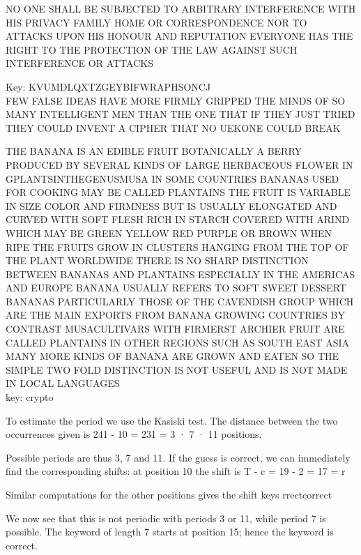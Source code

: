\documentclass[12pt,a4paper]{article}
\begin{document}
\frontpart

 \exercise
	NO ONE SHALL BE SUBJECTED TO ARBITRARY INTERFERENCE WITH HIS PRIVACY FAMILY HOME OR CORRESPONDENCE NOR TO ATTACKS UPON HIS HONOUR AND REPUTATION EVERYONE HAS THE RIGHT TO THE PROTECTION OF THE LAW AGAINST SUCH INTERFERENCE OR ATTACKS

	

 \exercise
 	Key: KVUMDLQXTZGEYBIFWRAPHSONCJ \\
 	\newline
 	FEW FALSE IDEAS HAVE MORE FIRMLY GRIPPED THE MINDS OF SO MANY INTELLIGENT MEN THAN THE ONE THAT IF THEY JUST TRIED THEY COULD INVENT A CIPHER THAT NO UEKONE COULD BREAK

 \exercise
 	THE BANANA IS AN EDIBLE FRUIT BOTANICALLY A BERRY PRODUCED BY SEVERAL KINDS OF LARGE HERBACEOUS FLOWER IN GPLANTSINTHEGENUSMUSA IN SOME COUNTRIES BANANAS 
	USED FOR COOKING MAY BE CALLED PLANTAINS THE FRUIT IS VARIABLE IN SIZE COLOR AND FIRMNESS BUT IS USUALLY ELONGATED AND CURVED WITH SOFT FLESH RICH IN STARCH
	COVERED WITH ARIND WHICH MAY BE GREEN YELLOW RED PURPLE OR BROWN WHEN RIPE THE FRUITS GROW IN CLUSTERS HANGING FROM THE TOP OF THE PLANT WORLDWIDE
	THERE IS NO SHARP DISTINCTION BETWEEN BANANAS AND PLANTAINS ESPECIALLY IN THE AMERICAS AND EUROPE BANANA USUALLY REFERS TO SOFT SWEET DESSERT BANANAS 
	PARTICULARLY THOSE OF THE CAVENDISH GROUP WHICH ARE THE MAIN EXPORTS FROM BANANA GROWING COUNTRIES BY CONTRAST MUSACULTIVARS WITH FIRMERST ARCHIER FRUIT ARE CALLED 
	PLANTAINS IN OTHER REGIONS SUCH AS SOUTH EAST ASIA MANY MORE KINDS OF BANANA ARE GROWN AND EATEN SO THE SIMPLE TWO FOLD DISTINCTION IS NOT USEFUL AND IS NOT 
	MADE IN LOCAL LANGUAGES \\
	\newline 
	\noindent key: crypto


 \exercise
 To estimate the period we use the Kasiski test. The distance between the two occurrences
 given is
 241 - 10 = 231 = 3 · 7 · 11
 positions.
 
 Possible periods are thus 3, 7 and 11. If the guess is correct, we can immediately find the
 corresponding shifts: at position 10 the shift is
 T - c = 19 - 2 = 17 = r
 
 Similar computations for the other positions gives the shift keys
 rrectcorrect
 
 We now see that this is not periodic with periods 3 or 11, while period 7 is possible. The keyword
 of length 7 starts at position 15; hence the keyword is
 correct. 
\end{document}

